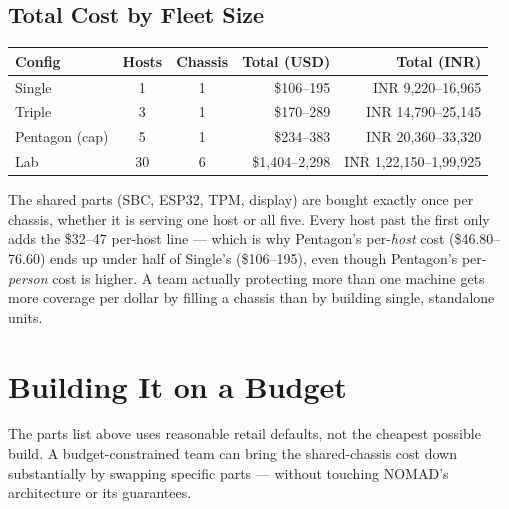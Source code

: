 \documentclass[11pt,a4paper]{article}
\begin{document}
\subsection{Total Cost by Fleet Size}

\begin{center}
\renewcommand{\arraystretch}{1.3}
\small
\begin{tabular}{@{}lccrr@{}}
\toprule
\textbf{Config} & \textbf{Hosts} & \textbf{Chassis} & \textbf{Total (USD)} & \textbf{Total (INR)} \\
\midrule
Single & 1 & 1 & \$106--195 & INR 9,220--16,965 \\
Triple & 3 & 1 & \$170--289 & INR 14,790--25,145 \\
Pentagon (cap) & 5 & 1 & \$234--383 & INR 20,360--33,320 \\
Lab & 30 & 6 & \$1,404--2,298 & INR 1,22,150--1,99,925 \\
\bottomrule
\end{tabular}
\end{center}

\begin{plainbox}
The shared parts (SBC, ESP32, TPM, display) are bought exactly once per
chassis, whether it is serving one host or all five. Every host past the
first only adds the \$32--47 per-host line --- which is why Pentagon's
per-\emph{host} cost (\$46.80--76.60) ends up under half of Single's
(\$106--195), even though Pentagon's per-\emph{person} cost is higher.
A team actually protecting more than one machine gets more coverage per
dollar by filling a chassis than by building single, standalone units.
\end{plainbox}

\section{Building It on a Budget}
\label{sec:budget}

The parts list above uses reasonable retail defaults, not the cheapest
possible build. A budget-constrained team can bring the shared-chassis
cost down substantially by swapping specific parts --- without touching
NOMAD's architecture or its guarantees.
\end{document}

